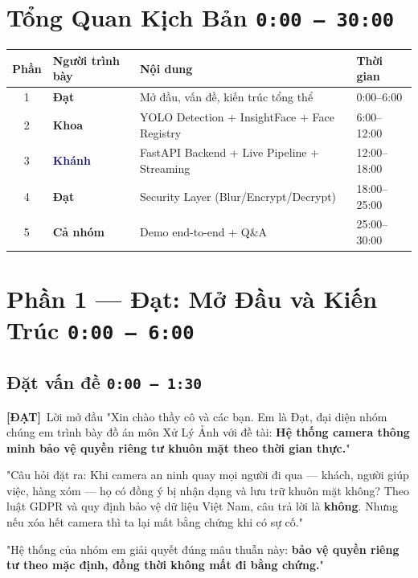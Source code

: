 \documentclass[12pt, a4paper]{article}
\newcommand{\timing}[1]{%
  \hfill\colorbox{NavyBlue!20}{\texttt{\small #1}}%
}
\newcommand{\dat}{\textcolor{BrickRed}{\textbf{[ĐẠT]}}}
\begin{document}
\tableofcontents
\newpage

\section{Tổng Quan Kịch Bản \timing{0:00 – 30:00}}

\begin{tcolorbox}[colback=NavyBlue!5, colframe=NavyBlue]
\centering
\renewcommand{\arraystretch}{1.6}
\begin{tabularx}{\textwidth}{clXl}
\toprule
\textbf{Phần} & \textbf{Người trình bày} & \textbf{Nội dung} & \textbf{Thời gian} \\
\midrule
1 & \textcolor{BrickRed}{\textbf{Đạt}} & Mở đầu, vấn đề, kiến trúc tổng thể & 0:00--6:00 \\
2 & \textcolor{OliveGreen}{\textbf{Khoa}} & YOLO Detection + InsightFace + Face Registry & 6:00--12:00 \\
3 & \textcolor{MidnightBlue}{\textbf{Khánh}} & FastAPI Backend + Live Pipeline + Streaming & 12:00--18:00 \\
4 & \textcolor{BrickRed}{\textbf{Đạt}} & Security Layer (Blur/Encrypt/Decrypt) & 18:00--25:00 \\
5 & \textbf{Cả nhóm} & Demo end-to-end + Q\&A & 25:00--30:00 \\
\bottomrule
\end{tabularx}
\end{tcolorbox}

\section{Phần 1 — Đạt: Mở Đầu và Kiến Trúc \timing{0:00 – 6:00}}

\subsection{Đặt vấn đề \timing{0:00 – 1:30}}

\begin{dialog}{\dat\ Lời mở đầu}
"Xin chào thầy cô và các bạn. Em là Đạt, đại diện nhóm chúng em
trình bày đồ án môn Xử Lý Ảnh với đề tài:
\textbf{Hệ thống camera thông minh bảo vệ quyền riêng tư khuôn mặt theo thời gian thực.}"

\vspace{0.3em}
"Câu hỏi đặt ra: Khi camera an ninh quay mọi người đi qua
--- khách, người giúp việc, hàng xóm ---
họ có đồng ý bị nhận dạng và lưu trữ khuôn mặt không?
Theo luật GDPR và quy định bảo vệ dữ liệu Việt Nam,
câu trả lời là \textbf{không}.
Nhưng nếu xóa hết camera thì ta lại mất bằng chứng khi có sự cố."

\vspace{0.3em}
"Hệ thống của nhóm em giải quyết đúng mâu thuẫn này:
\textbf{bảo vệ quyền riêng tư theo mặc định, đồng thời không mất đi bằng chứng.}"
\end{dialog}
\end{document}
